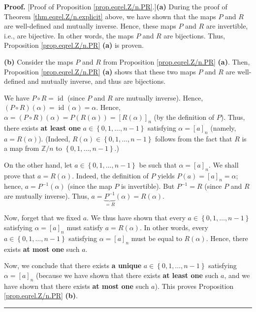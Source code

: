\documentclass[numbers=enddot,12pt,final,onecolumn,notitlepage]{scrartcl}%
\numberwithin{exer}{subsection}
\theoremstyle{definition}
\newenvironment{proof}[1][Proof]{\noindent\textbf{#1.} }{\ \rule{0.5em}{0.5em}}
\begin{document}
\begin{proof}
[Proof of Proposition \ref{prop.eqrel.Z/n.PR}.]\textbf{(a)} During the proof
of Theorem \ref{thm.eqrel.Z/n.explicit} above, we have shown that the maps $P$
and $R$ are well-defined and mutually inverse. Hence, these maps $P$ and $R$
are invertible, i.e., are bijective. In other words, the maps $P$ and $R$ are
bijections. Thus, Proposition \ref{prop.eqrel.Z/n.PR} \textbf{(a)} is proven.

\textbf{(b)} Consider the maps $P$ and $R$ from Proposition
\ref{prop.eqrel.Z/n.PR} \textbf{(a)}. Then, Proposition
\ref{prop.eqrel.Z/n.PR} \textbf{(a)} shows that these two maps $P$ and $R$ are
well-defined and mutually inverse, and thus are bijections.

We have $P\circ R=\operatorname*{id}$ (since $P$ and $R$ are mutually
inverse). Hence, $\left(  P\circ R\right)  \left(  \alpha\right)
=\operatorname*{id}\left(  \alpha\right)  =\alpha$. Hence, $\alpha=\left(
P\circ R\right)  \left(  \alpha\right)  =P\left(  R\left(  \alpha\right)
\right)  =\left[  R\left(  \alpha\right)  \right]  _{n}$ (by the definition of
$P$). Thus, there exists \textbf{at least one} $a\in\left\{  0,1,\ldots
,n-1\right\}  $ satisfying $\alpha=\left[  a\right]  _{n}$ (namely,
$a=R\left(  \alpha\right)  $). (Indeed, $R\left(  \alpha\right)  \in\left\{
0,1,\ldots,n-1\right\}  $ follows from the fact that $R$ is a map from
$\mathbb{Z}/n$ to $\left\{  0,1,\ldots,n-1\right\}  $.)

On the other hand, let $a\in\left\{  0,1,\ldots,n-1\right\}  $ be such that
$\alpha=\left[  a\right]  _{n}$. We shall prove that $a=R\left(
\alpha\right)  $. Indeed, the definition of $P$ yields $P\left(  a\right)
=\left[  a\right]  _{n}=\alpha$; hence, $a=P^{-1}\left(  \alpha\right)  $
(since the map $P$ is invertible). But $P^{-1}=R$ (since $P$ and $R$ are
mutually inverse). Thus, $a=\underbrace{P^{-1}}_{=R}\left(  \alpha\right)
=R\left(  \alpha\right)  $.

Now, forget that we fixed $a$. We thus have shown that every $a\in\left\{
0,1,\ldots,n-1\right\}  $ satisfying $\alpha=\left[  a\right]  _{n}$ must
satisfy $a=R\left(  \alpha\right)  $. In other words, every $a\in\left\{
0,1,\ldots,n-1\right\}  $ satisfying $\alpha=\left[  a\right]  _{n}$ must be
equal to $R\left(  \alpha\right)  $. Hence, there exists \textbf{at most one}
such $a$.

Now, we conclude that there exists \textbf{a unique }$a\in\left\{
0,1,\ldots,n-1\right\}  $ satisfying $\alpha=\left[  a\right]  _{n}$ (because
we have shown that there exists \textbf{at least one} such $a$, and we have
shown that there exists \textbf{at most one} such $a$). This proves
Proposition \ref{prop.eqrel.Z/n.PR} \textbf{(b)}.
\end{proof}
\end{document}
